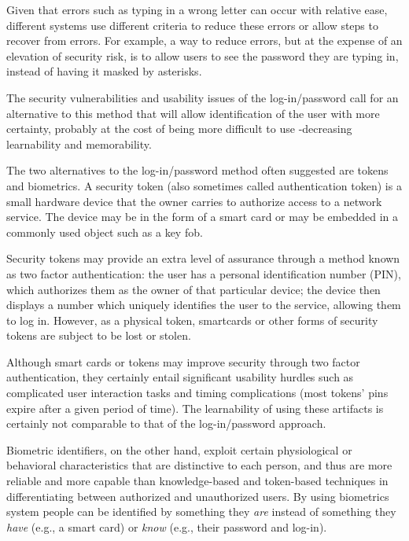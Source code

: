\documentclass{article}
\begin{document}
Given that errors such as typing in a wrong letter can occur with relative ease, different systems use different criteria to reduce these errors or allow steps to recover from errors. For example, a way to reduce errors, but at the expense of an elevation of security risk, is to allow users to see the password they are typing in, instead of having it masked by asterisks.

The security vulnerabilities and usability issues of the log-in/password call for an alternative to this method that will allow identification of the user with more certainty, probably at the cost of being more difficult to use -decreasing learnability and memorability.

The two alternatives to the log-in/password method often suggested are tokens and biometrics. A security token (also sometimes called authentication token) is a small hardware device that the owner carries to authorize access to a network service. The device may be in the form of a smart card or may be embedded in a commonly used object such as a key fob. 

Security tokens may provide an extra level of assurance through a method known as two factor authentication: the user has a personal identification number (PIN), which authorizes them as the owner of that particular device; the device then displays a number which uniquely identifies the user to the service, allowing them to log in. However, as a physical token, smartcards or other forms of security tokens are subject to be lost or stolen. 

Although smart cards or tokens may improve security through two factor authentication, they certainly entail significant usability hurdles such as complicated user interaction tasks and timing complications (most tokens' pins expire after a given period of time). The learnability of using these artifacts is certainly not comparable to that of the log-in/password approach.  

Biometric identifiers, on the other hand, exploit certain physiological or behavioral characteristics that are distinctive to each person, and thus are more reliable and more capable than knowledge-based and token-based techniques in differentiating between authorized and unauthorized users. By using biometrics system people can be identified by something they \textit{are} instead of something they \textit{have} (e.g., a smart card) or \textit{know} (e.g., their password and log-in). 
\end{document}
